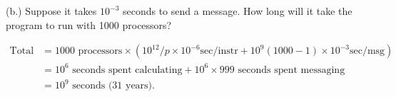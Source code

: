 \documentclass[11pt,epsfig,letterpaper]{article}
\begin{document}
\begin{enumerate}
            (b.) Suppose it takes $10^{-3}$ seconds to send a message. How long will it take the program to run with 1000 processors?
            \vspace{0.5pc}

            \begin{align*}
              \textrm{Total Time} &= 1000 \textrm{ processors} \times (10^{12}/p \times  10^{-6} \textrm{sec/instr} +  10^{9}(1000-1) \times 10^{-3}\textrm{sec/msg})\\
                                  &= 10^{6} \textrm{ seconds spent calculating} + 10^{6} \times 999 \textrm{ seconds spent messaging} \\
                                  &= 10^{9} \textrm{ seconds (31 years)}.\\
            \end{align*}



            
    \end{enumerate}
\end{document}
